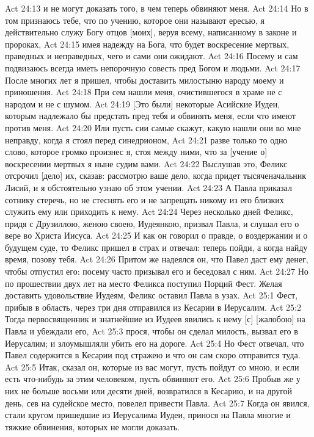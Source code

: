 Act 24:13  и не могут доказать того, в чем теперь обвиняют меня.
Act 24:14  Но в том признаюсь тебе, что по учению, которое они называют ересью, я действительно служу Богу отцов [моих], веруя всему, написанному в законе и пророках,
Act 24:15  имея надежду на Бога, что будет воскресение мертвых, праведных и неправедных, чего и сами они ожидают.
Act 24:16  Посему и сам подвизаюсь всегда иметь непорочную совесть пред Богом и людьми.
Act 24:17  После многих лет я пришел, чтобы доставить милостыню народу моему и приношения.
Act 24:18  При сем нашли меня, очистившегося в храме не с народом и не с шумом.
Act 24:19  [Это были] некоторые Асийские Иудеи, которым надлежало бы предстать пред тебя и обвинять меня, если что имеют против меня.
Act 24:20  Или пусть сии самые скажут, какую нашли они во мне неправду, когда я стоял перед синедрионом,
Act 24:21  разве только то одно слово, которое громко произнес я, стоя между ними, что за [учение о] воскресении мертвых я ныне судим вами.
Act 24:22  Выслушав это, Феликс отсрочил [дело] их, сказав: рассмотрю ваше дело, когда придет тысяченачальник Лисий, и я обстоятельно узнаю об этом учении.
Act 24:23  А Павла приказал сотнику стеречь, но не стеснять его и не запрещать никому из его близких служить ему или приходить к нему.
Act 24:24  Через несколько дней Феликс, придя с Друзиллою, женою своею, Иудеянкою, призвал Павла, и слушал его о вере во Христа Иисуса.
Act 24:25  И как он говорил о правде, о воздержании и о будущем суде, то Феликс пришел в страх и отвечал: теперь пойди, а когда найду время, позову тебя.
Act 24:26  Притом же надеялся он, что Павел даст ему денег, чтобы отпустил его: посему часто призывал его и беседовал с ним.
Act 24:27  Но по прошествии двух лет на место Феликса поступил Порций Фест. Желая доставить удовольствие Иудеям, Феликс оставил Павла в узах.
Act 25:1  Фест, прибыв в область, через три дня отправился из Кесарии в Иерусалим.
Act 25:2  Тогда первосвященник и знатнейшие из Иудеев явились к нему [с] [жалобою] на Павла и убеждали его,
Act 25:3  прося, чтобы он сделал милость, вызвал его в Иерусалим; и злоумышляли убить его на дороге.
Act 25:4  Но Фест отвечал, что Павел содержится в Кесарии под стражею и что он сам скоро отправится туда.
Act 25:5  Итак, сказал он, которые из вас могут, пусть пойдут со мною, и если есть что-нибудь за этим человеком, пусть обвиняют его.
Act 25:6  Пробыв же у них не больше восьми или десяти дней, возвратился в Кесарию, и на другой день, сев на судейское место, повелел привести Павла.
Act 25:7  Когда он явился, стали кругом пришедшие из Иерусалима Иудеи, принося на Павла многие и тяжкие обвинения, которых не могли доказать.
